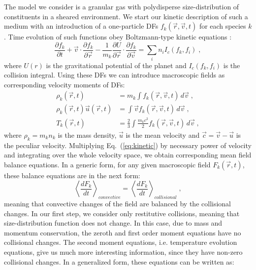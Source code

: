 \documentclass[11pt, notitlepage]{article} %
\begin{document}
The model we consider is a granular gas with polydisperse size-distribution 
of constituents in a sheared environment. We start our kinetic description of such a medium 
with an introduction of a one-particle DFs $f_k(\vec{r}, \vec{v}, t)$ for each species $k$. Time evolution of such functions 
obey Boltzmann-type kinetic equations \citep{Haff1983, Brilliantov2004}:
\begin{equation}\label{eq:kinetic}
	\frac{\partial f_k}{\partial t}+\vec{v}\cdot\frac{\partial f_k}{\partial\vec{r}}-
	\frac{1}{m_k}\frac{\partial U}{\partial\vec{r}}\cdot\frac{\partial f_k}{\partial\vec{v}}=
	\sum_i n_iI_c(f_k,f_i)\;,
\end{equation}
where $U(r)$ is the gravitational potential of the planet and $I_c(f_k, f_i)$ is the collision integral. Using these DFs we 
can introduce macroscopic fields as corresponding velocity moments of DFs:
\begin{equation}
	\begin{split}
		\rho_k(\vec{r}, t) &= m_k\int f_k(\vec{r}, \vec{v}, t)\,d\vec{v}\;,\\
		\rho_k(\vec{r}, t)\vec{u}(\vec{r}, t) &= \int \vec{v}f_k(\vec{r}, \vec{v}, t)\,d\vec{v}\;,\\
		T_k(\vec{r}, t) &= \frac{2}{3}\int \frac{m_k c^2}{2}f_k(\vec{r}, \vec{v}, t)\,d\vec{v}\;,
	\end{split}
\end{equation}
where $\rho_k=m_kn_k$ is the mass density, $\vec{u}$ is the mean velocity and $\vec{c}=\vec{v}-\vec{u}$ is the peculiar velocity.
Multiplying Eq.~(\ref{eq:kinetic}) by necessary power of velocity and integrating over the whole velocity space, we obtain 
corresponding mean field balance equations. In a generic form, for any given macroscopic field $F_k(\vec{r},t)$, these balance equations 
are in the next form:
\begin{equation}
	\left\langle\frac{dF_k}{dt}\right\rangle_{convective}=\left\langle\frac{dF_k}{dt}\right\rangle_{collisional}\;,
\end{equation}
meaning that convective changes of the field are balanced by the collisional changes. In our first step, we consider only restitutive 
collisions, meaning that size-distribution function does not change. In this case, due to mass and momentum conservation, the 
zeroth and first order moment equations have no collisional changes. The second moment equations, i.e. temperature evolution equations,
give us much more interesting information, since they have non-zero collisional changes. In a generalized form, these equations can be written as:
\end{document}
